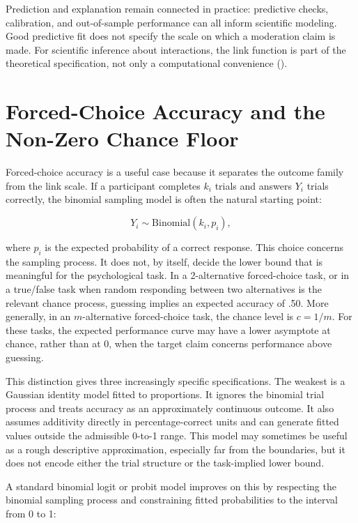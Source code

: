 \documentclass[
  man,
  longtable,
  nolmodern,
  notxfonts,
  notimes,
  colorlinks=true,linkcolor=blue,citecolor=blue,urlcolor=blue]{apa7}
\begin{document}
Prediction and explanation remain connected in practice: predictive
checks, calibration, and out-of-sample performance can all inform
scientific modeling. Good predictive fit does not specify the scale on
which a moderation claim is made. For scientific inference about
interactions, the link function is part of the theoretical
specification, not only a computational convenience
().

\section{Forced-Choice Accuracy and the Non-Zero Chance
Floor}\label{forced-choice-accuracy-and-the-non-zero-chance-floor}

Forced-choice accuracy is a useful case because it separates the outcome
family from the link scale. If a participant completes \(k_i\) trials
and answers \(Y_i\) trials correctly, the binomial sampling model is
often the natural starting point:

\[
Y_i \sim \mathrm{Binomial}(k_i, p_i),
\]

where \(p_i\) is the expected probability of a correct response. This
choice concerns the sampling process. It does not, by itself, decide the
lower bound that is meaningful for the psychological task. In a
2-alternative forced-choice task, or in a true/false task when random
responding between two alternatives is the relevant chance process,
guessing implies an expected accuracy of .50. More generally, in an
\(m\)-alternative forced-choice task, the chance level is \(c = 1/m\).
For these tasks, the expected performance curve may have a lower
asymptote at chance, rather than at 0, when the target claim concerns
performance above guessing.

This distinction gives three increasingly specific specifications. The
weakest is a Gaussian identity model fitted to proportions. It ignores
the binomial trial process and treats accuracy as an approximately
continuous outcome. It also assumes additivity directly in
percentage-correct units and can generate fitted values outside the
admissible 0-to-1 range. This model may sometimes be useful as a rough
descriptive approximation, especially far from the boundaries, but it
does not encode either the trial structure or the task-implied lower
bound.

A standard binomial logit or probit model improves on this by respecting
the binomial sampling process and constraining fitted probabilities to
the interval from 0 to 1:
\end{document}
